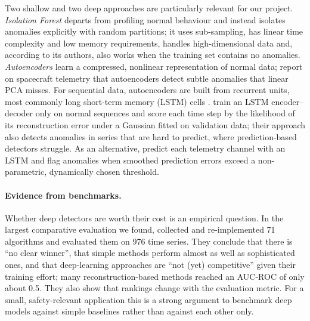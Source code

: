 Two shallow and two deep approaches are particularly relevant for our project. \emph{Isolation Forest} \citep{liu2008isolation} departs from profiling normal behaviour and instead isolates anomalies explicitly with random partitions; it uses sub-sampling, has linear time complexity and low memory requirements, handles high-dimensional data and, according to its authors, also works when the training set contains no anomalies. \emph{Autoencoders} learn a compressed, nonlinear representation of normal data; \citet{sakurada2014autoencoders} report on spacecraft telemetry that autoencoders detect subtle anomalies that linear PCA misses. For sequential data, autoencoders are built from recurrent units, most commonly long short-term memory (LSTM) cells \citep{hochreiter1997lstm}. \citet{malhotra2016lstm} train an LSTM encoder--decoder only on normal sequences and score each time step by the likelihood of its reconstruction error under a Gaussian fitted on validation data; their approach also detects anomalies in series that are hard to predict, where prediction-based detectors struggle. As an alternative, \citet{hundman2018detecting} predict each telemetry channel with an LSTM and flag anomalies when smoothed prediction errors exceed a non-parametric, dynamically chosen threshold.

\paragraph{Evidence from benchmarks.}
Whether deep detectors are worth their cost is an empirical question. In the largest comparative evaluation we found, \citet{schmidl2022anomaly} collected and re-implemented 71 algorithms and evaluated them on 976 time series. They conclude that there is ``no clear winner'', that simple methods perform almost as well as sophisticated ones, and that deep-learning approaches are ``not (yet) competitive'' given their training effort; many reconstruction-based methods reached an AUC-ROC of only about 0.5. They also show that rankings change with the evaluation metric. For a small, safety-relevant application this is a strong argument to benchmark deep models against simple baselines rather than against each other only.

